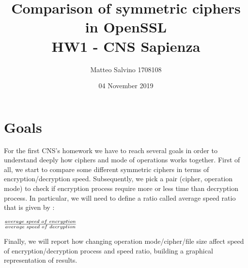 \documentclass[11pt]{article}
\begin{document}
\title{Comparison of symmetric ciphers in OpenSSL \\ \large HW1 - CNS Sapienza}
\author{Matteo Salvino 1708108}
\date{04 November 2019}
\maketitle

\section{Goals}
For the first CNS's homework we have to reach several goals in order to understand deeply how ciphers and mode of operations works together. First of all, we start to compare some different symmetric ciphers in terms of encryption/decryption speed. Subsequently, we pick a pair (cipher, operation mode) to check if encryption process require more or less time than decryption process. In particular, we will need to define a ratio called average speed ratio that is given by :
\begin{center}
$\frac{average\hspace{0.1cm}speed\hspace{0.1cm}of\hspace{0.1cm}encryption}{average\hspace{0.1cm}speed\hspace{0.1cm}of\hspace{0.1cm}decryption}$
\end{center}
Finally, we will report how changing operation mode/cipher/file size affect speed of encryption/decryption process and speed ratio, building a graphical representation of results.
\end{document}
